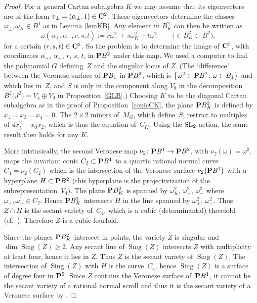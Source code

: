 \documentclass[pdftex]{sigma}
\numberwithin{equation}{section}
\begin{document}
\begin{proof}
For a~general Cartan subalgebra $K$ we may assume that its eigenvectors
are of the form $v_\pm=(\alpha_\pm,1)\in{\bf C}^2$.
These eigenvectors determine the classes $\omega_\pm,\omega_K\in B^1$ as in
Lemma \ref{lemKB}.
Any element in $B^2_K$ can then be written as
\[
\omega(\alpha_+,\alpha_-,r,s,t) := r\omega_+^2 + s\omega^2_K + t\omega^2_-\qquad
\big(\!\!\in B_K^2\subset B^2\big),
\]
for a certain $(r,s,t)\in {\bf C}^3$. So the problem is to determine the image of ${\bf C}^5$,
with coordinates $\alpha_+$, $\alpha_-$, $r$, $s$, $t$, in ${\bf P} B^2$ under this map.
We used a computer to find the polynomial $G$ defining~$Z$ and the singular locus of $Z$.
(The `difference' between the Veronese surface of ${\bf P} B_1$ in ${\bf P} B^2$, which is
$\big\{\omega^2\in{\bf P} B^2\colon \omega\in B_1\big\}$ and which lies in~$Z$,
and $S$ is only in the component along $V_0$ in the decomposition
$B^2\big(J^2\big)=V_4\oplus V_0$ in Proposition~\ref{GLB}.)
Choosing $K$ to be the diagonal Cartan subalgebra as in the proof of Proposition~\ref{conicCK},
the plane ${\bf P} B^2_K$ is defined by $x_1=x_3=x_4=0$. The $2\times 2$ minors of~$M_G$,
which define~$S$, restrict to multiples of $4x_5^2-x_0x_2$, which is thus the equation of~$C_K$.
Using the ${\rm SL}_2$-action, the same result then holds for any $K$.

More intrinsically, the second Veronese map $\nu_2\colon {\bf P} B^1\rightarrow{\bf P} B^2$, with
$\nu_2(\omega)=\omega^2$, maps the invariant conic $C_2\subset{\bf P} B^1$ to
a quartic rational normal curve $C_4=\nu_2(C_2)$ which is the intersection of the Veronese surface
$\nu_2\big({\bf P} B^1\big)$ with a hyperplane $H\subset{\bf P} B^2$ (this hyperplane is the projectivization of
the subrepresentation~$V_4$).
The plane ${\bf P} B^2_K$ is spanned by $\omega_K^2$, $\omega_+^2$, $\omega_-^2$ where
$\omega_+,\omega_-\in C_2$. Hence ${\bf P} B^2_K$ intersects $H$ in the line spanned by
$\omega_+^2$, $\omega_-^2$. Thus $Z\cap H$ is the secant variety of~$C_4$, which is a cubic
(determinantal) threefold
(cf.\ \cite[Proposition~9.7]{Harris}). Therefore $Z$ is a cubic fourfold.

Since the planes ${\bf P} B^2_K$ intersect in points, the variety $Z$ is singular
and $\dim\operatorname{Sing}(Z)\geq 2$.
Any secant line of $\operatorname{Sing}(Z)$ intersects $Z$ with multiplicity at least four,
hence it lies in $Z$. Thus $Z$ is the secant variety of $\operatorname{Sing}(Z)$. The intersection
of $\operatorname{Sing}(Z)$ with $H$ is the curve~$C_4$, hence $\operatorname{Sing}(Z)$ is a surface of degree four
in ${\bf P}^5$. Since $Z$ contains the Veronese surface of~${\bf P} B^1$, it cannot be the secant variety
of a rational normal scroll and thus it is the secant variety of a Veronese surface by
\cite[Proposition, p.~525]{GH}.
\end{proof}
\end{document}
